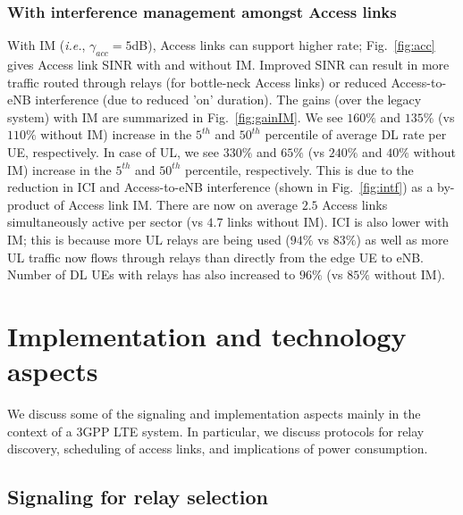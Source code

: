 \documentclass[journal]{IEEEtran}
\newcommand{\ie}{\emph{i.e.}}
\begin{document}
\subsubsection{With interference management amongst Access links}
With IM (\ie, $\gamma_{acc}=5$dB), Access links can support higher rate; Fig.~\ref{fig:acc} gives Access link SINR with and without IM.  Improved SINR can result in more traffic routed through relays (for bottle-neck Access links) or reduced Access-to-eNB interference (due to reduced 'on' duration).  The gains (over the legacy system) with IM are summarized in Fig.~\ref{fig:gainIM}.  We see $160\%$ and $135\%$ (vs $110\%$ without IM) increase in the $5^{th}$ and $50^{th}$ percentile of average DL rate per UE, respectively.  In case of UL, we see $330\%$ and $65\%$ (vs $240\%$ and $40\%$ without IM) increase in the $5^{th}$ and $50^{th}$ percentile, respectively.  This is due to the reduction in ICI and Access-to-eNB interference (shown in Fig.~\ref{fig:intf}) as a by-product of Access link IM.  There are now on average $2.5$ Access links simultaneously active per sector (vs $4.7$ links without IM).  ICI is also lower with IM; this is because more UL relays are being used ($94\%$ vs $83\%$) as well as more UL traffic now flows through relays than directly from the edge UE to eNB.  Number of DL UEs with relays has also increased to $96\%$ (vs $85\%$ without IM).



\section{Implementation and technology aspects}
\label{sec:implementation}

We discuss some of the signaling and implementation aspects mainly in the context of a 3GPP LTE system. In particular, we discuss protocols for relay discovery, scheduling of access links, and implications of power consumption.

\subsection{Signaling for relay selection}
\end{document}
